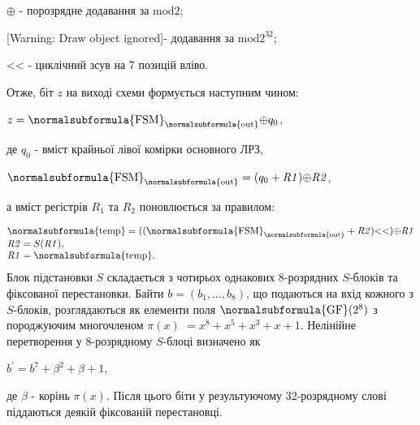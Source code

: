  ${{\oplus}}$ - порозрядне додавання за  ${\text{mod}2}$;

[Warning: Draw object ignored]{}- додавання за  ${\text{mod}2^{{\text{32}}}}$;

{\textless}{\textless} {}- циклічний зсув на 7 позицій вліво.

Отже, біт  ${z}$ на виході схеми формується наступним чином:

{\centering

${z=\normalsubformula{\text{FSM}}_{{\normalsubformula{\text{out}}}}{\oplus}q_{{0}}}$,
\par}

де  ${q_{{0}}}$ - вміст крайньої лівої комірки  основного ЛРЗ,

{\centering

${\normalsubformula{\text{FSM}}_{{\normalsubformula{\text{out}}}}=(q_{{0}}+\mathit{R1}){\oplus}\mathit{R2}}$,
\par}

а вміст регістрів  ${R_{{1}}}$ та  ${R_{{2}}}$ поновлюється за правилом:

\begin{equation*}
\begin{matrix}{\normalsubformula{\text{temp}}=((\normalsubformula{\text{FSM}}_{{\normalsubformula{\text{out}}}}+\mathit{R2})\text{{\textless}{\textless}}){\oplus}\mathit{R1}}\hfill\null
\\\mathit{R2}=S(\mathit{R1}),\hfill\null
\\\mathit{R1}=\normalsubformula{\text{temp}}\text{.}\hfill\null
\end{matrix}\hfill 
\end{equation*}
Блок підстановки  ${S}$ складається з чотирьох однакових 8-розрядних 
${S}${}-блоків та фіксованої перестановки. Байти 
${b=(b_{{1}},\dots,b_{{8}})}$, що подаються на вхід кожного
з  ${S}${}-блоків, розглядаються як елементи поля 
${\normalsubformula{\text{GF}}(2^{{8}})}$ з породжуючим многочленом   ${\pi
(x)}$ ${=x^{{8}}+x^{{5}}+x^{{3}}+x+1}$. Нелінійне перетворення у 8-розрядному 
${S}${}-блоці визначено як

{\centering
 ${{b}^{'}=b^{{7}}+\beta ^{{2}}+\beta +1}$,
\par}

де  ${\beta }$ - корінь  ${\pi (x)}$. Після цього біти у результуючому
32-розрядному слові піддаються деякій фіксованій перестановці.


\bigskip

{\par}


